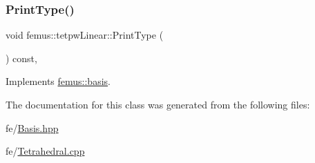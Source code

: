 \subsubsection{\texorpdfstring{Print\+Type()}{PrintType()}}
{\footnotesize\ttfamily void femus\+::tetpw\+Linear\+::\+Print\+Type (\begin{DoxyParamCaption}{ }\end{DoxyParamCaption}) const\hspace{0.3cm}{\ttfamily [inline]}, {\ttfamily [virtual]}}



Implements \mbox{\hyperlink{classfemus_1_1basis_abbae7bf8f31ec5793c911bc6d4ea0572}{femus\+::basis}}.



The documentation for this class was generated from the following files\+:\begin{DoxyCompactItemize}
\item 
fe/\mbox{\hyperlink{_basis_8hpp}{Basis.\+hpp}}\item 
fe/\mbox{\hyperlink{_tetrahedral_8cpp}{Tetrahedral.\+cpp}}\end{DoxyCompactItemize}
